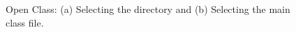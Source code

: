 
\begin{figure}[!ht]
\begin{center}
\qquad
{}
\caption{Open Class: (a) Selecting the directory and (b) Selecting
the main class file.}\label{fig-jabuti-open-class}
\end{center}
\end{figure}
